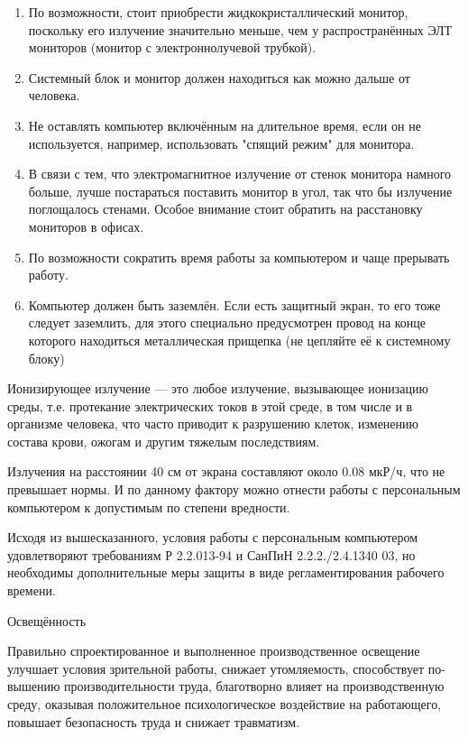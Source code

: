 \begin{enumerate}[1.]
	\item По возможности, стоит приобрести жидкокристаллический монитор, поскольку его излучение значительно меньше, чем у распространённых ЭЛТ мониторов (монитор с электроннолучевой трубкой). 
	\item Системный блок и монитор должен находиться как можно дальше от человека.
	\item Не оставлять компьютер включённым на длительное время, если он не используется, например, использовать "спящий режим" для монитора.
	\item В связи с тем, что электромагнитное излучение от стенок монитора намного больше, лучше постараться поставить монитор в угол, так что бы излучение поглощалось стенами. Особое внимание стоит обратить на расстановку мониторов в офисах.
	\item По возможности сократить время работы за компьютером и чаще прерывать работу.
	\item Компьютер должен быть заземлён. Если есть защитный экран, то его тоже следует заземлить, для этого специально предусмотрен провод на конце которого находиться металлическая прищепка (не цепляйте её к системному блоку)
\end{enumerate}

Ионизирующее излучение --- это любое излучение, вызывающее ионизацию среды, т.е. протекание электрических токов в этой среде, в том числе и в организме человека, что часто приводит к разрушению клеток, изменению состава крови, ожогам и другим тяжелым последствиям.

Излучения на расстоянии 40 см от экрана составляют около 0.08 мкР/ч, что не превышает нормы.
И по данному фактору можно отнести работы с персональным компьютером к допустимым по степени вредности. 

Исходя из вышесказанного, условия работы с персональным компьютером удовлетворяют требованиям Р 2.2.013-94 и СанПиН 2.2.2./2.4.1340 03, но необходимы дополнительные меры защиты в виде регламентирования рабочего времени.

\point Освещённость

Правильно спроектированное и выполненное производственное освещение улучшает условия зрительной работы, снижает утомляемость, способствует по-вышению производительности труда, благотворно влияет на производственную среду, оказывая положительное психологическое воздействие на работающего, повышает безопасность труда и  снижает травматизм.

